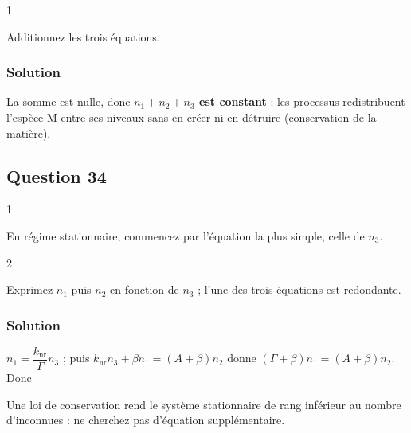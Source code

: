 \documentclass[11pt,a4paper]{article}
\newcommand{\equationajustee}[1]{%
  \sbox{\boiteequation}{$\displaystyle #1$}%
  \ifdim\wd\boiteequation>\linewidth
    \[\resizebox{\linewidth}{!}{\usebox{\boiteequation}}\]%
  \else
    \[#1\]%
  \fi}
\begin{document}
\begin{indication}{1}

Additionnez les trois équations.

\end{indication}

\hypertarget{solution-32}{%
\subsubsection{Solution}\label{solution-32}}

La somme est nulle, donc \textbf{\(n_1+n_2+n_3\) est constant} : les processus redistribuent l'espèce M entre ses niveaux sans en créer ni en détruire (conservation de la matière).

\hypertarget{question-34}{%
\subsection{Question 34}\label{question-34}}

\begin{indication}{1}

En régime stationnaire, commencez par l'équation la plus simple, celle de \(n_3\).

\end{indication}

\begin{indication}{2}

Exprimez \(n_1\) puis \(n_2\) en fonction de \(n_3\) ; l'une des trois équations est redondante.

\end{indication}

\hypertarget{solution-33}{%
\subsubsection{Solution}\label{solution-33}}

\(n_1=\dfrac{k_{\mathrm{nr}}}{\Gamma}n_3\) ; puis \(k_{\mathrm{nr}}n_3+\beta n_1=(A+\beta)n_2\) donne \((\Gamma+\beta)n_1=(A+\beta)n_2\). Donc

\equationajustee{\boxed{\begin{aligned}
\Delta n&=n_2-n_1\\
&=\frac{k_{\mathrm{nr}}(\Gamma-A)}{\Gamma(A+\beta)}\,n_3
\end{aligned}}}

\begin{methode}

Une loi de conservation rend le système stationnaire de rang inférieur au nombre d'inconnues : ne cherchez pas d'équation supplémentaire.

\end{methode}
\end{document}
